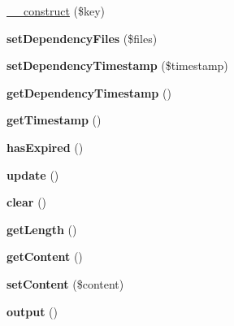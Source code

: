 \begin{DoxyCompactItemize}
\item 
\hyperlink{classCacheEntry_a827f326a6ca9262dd01769dff2fd302c}{\_\-\_\-construct} (\$key)
\item 
\hypertarget{classCacheEntry_a53e12186592e3b66853cdf20a5d917cc}{
{\bfseries setDependencyFiles} (\$files)}
\label{classCacheEntry_a53e12186592e3b66853cdf20a5d917cc}

\item 
\hypertarget{classCacheEntry_ab9043f64a2e09c87775561bec43037be}{
{\bfseries setDependencyTimestamp} (\$timestamp)}
\label{classCacheEntry_ab9043f64a2e09c87775561bec43037be}

\item 
\hypertarget{classCacheEntry_a2adb13ef5d64b8d905184d04a428c64f}{
{\bfseries getDependencyTimestamp} ()}
\label{classCacheEntry_a2adb13ef5d64b8d905184d04a428c64f}

\item 
\hypertarget{classCacheEntry_a5f1115160f227fb59b00d15a03593a5d}{
{\bfseries getTimestamp} ()}
\label{classCacheEntry_a5f1115160f227fb59b00d15a03593a5d}

\item 
\hypertarget{classCacheEntry_a980e98615603036c55c9db6ea338c34c}{
{\bfseries hasExpired} ()}
\label{classCacheEntry_a980e98615603036c55c9db6ea338c34c}

\item 
\hypertarget{classCacheEntry_a03e483cd10e0b053312ee5209b0443c5}{
{\bfseries update} ()}
\label{classCacheEntry_a03e483cd10e0b053312ee5209b0443c5}

\item 
\hypertarget{classCacheEntry_adfbb7f3424b021299e2dd2c445177ff0}{
{\bfseries clear} ()}
\label{classCacheEntry_adfbb7f3424b021299e2dd2c445177ff0}

\item 
\hypertarget{classCacheEntry_ac5db6b7486ef1a6100d8a9248d07e71a}{
{\bfseries getLength} ()}
\label{classCacheEntry_ac5db6b7486ef1a6100d8a9248d07e71a}

\item 
\hypertarget{classCacheEntry_a2d69e6a12d34bc5dff90861944999461}{
{\bfseries getContent} ()}
\label{classCacheEntry_a2d69e6a12d34bc5dff90861944999461}

\item 
\hypertarget{classCacheEntry_a99e701581c5b6b0b43a30fc4467fe5a6}{
{\bfseries setContent} (\$content)}
\label{classCacheEntry_a99e701581c5b6b0b43a30fc4467fe5a6}

\item 
\hypertarget{classCacheEntry_a1545ccd1ad6fb731f27e6b14b636e115}{
{\bfseries output} ()}
\label{classCacheEntry_a1545ccd1ad6fb731f27e6b14b636e115}

\end{DoxyCompactItemize}
